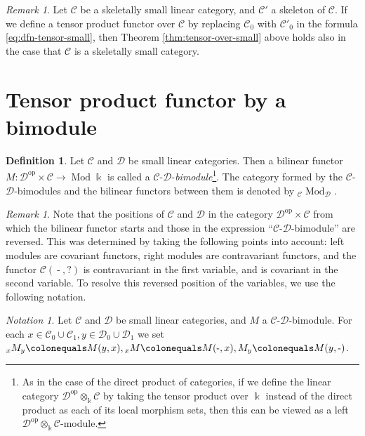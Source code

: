 \documentclass{surv-l}
\numberwithin{equation}{chapter}
\numberwithin{figure}{chapter}
\theoremstyle{plain}
\theoremstyle{definition}
\newtheorem{dfn}[thm]{Definition}
\theoremstyle{remark}
\newtheorem{rmk}[thm]{Remark}
\newtheorem{ntn}[thm]{Notation}
\newcommand{\bMod}[2]{{}_{#1}\!\Mod_{#2}}
\DeclareMathOperator{\Mod}{Mod}
\DeclareMathOperator{\blank}{-}
\begin{document}
\begin{rmk}
Let ${\mathcal{C}}$ be a skeletally small linear category, and ${\mathcal{C}}'$ a skeleton of ${\mathcal{C}}$.
If we define a tensor product functor over ${\mathcal{C}}$ by replacing ${\mathcal{C}}_0$ with ${\mathcal{C}}'_0$
in the formula \eqref{eq:dfn-tensor-small},
then Theorem \ref{thm:tensor-over-small} above holds also in the case that
${\mathcal{C}}$ is a skeletally small category.
\end{rmk}

\section{Tensor product functor by a bimodule}

\begin{dfn}\label{dfn:bimodule}
Let ${\mathcal{C}}$ and ${\mathcal{D}}$ be small linear categories.
Then a bilinear functor $M \colon {\mathcal{D}}^{\mathrm{op}} \times {\mathcal{C}} \to \Mod\Bbbk$ is called
a ${\mathcal{C}}$-${\mathcal{D}}$-\emph{bimodule}\footnote{As in the case of the direct product of categories,
if we define the linear category ${\mathcal{D}}^{\mathrm{op}} \otimes_\Bbbk {\mathcal{C}}$
by taking the tensor product over $\Bbbk$ instead of the direct product
as each of its local morphism sets,
then this can be viewed as a left ${\mathcal{D}}^{\mathrm{op}} \otimes_\Bbbk {\mathcal{C}}$-module.
}.
The category formed by the ${\mathcal{C}}$-${\mathcal{D}}$-bimodules and
the bilinear functors between them is denoted by $\bMod{\mathcal{C}}{\mathcal{D}}$.
\end{dfn}

\begin{rmk}
Note that the positions of ${\mathcal{C}}$ and ${\mathcal{D}}$ in the category ${\mathcal{D}}^{\mathrm{op}} \times {\mathcal{C}}$
from which the bilinear functor starts and those in the expression ``${\mathcal{C}}$-${\mathcal{D}}$-bimodule'' are reversed.
This was determined by taking the following points into account:
left modules are covariant functors, right modules are contravariant functors,
and the functor ${\mathcal{C}}(\blank, ?)$ is contravariant in the first variable,
and is covariant in the second variable.
To resolve this reversed position of the variables, we use the following notation.
\end{rmk}

\begin{ntn}
Let ${\mathcal{C}}$ and ${\mathcal{D}}$ be small linear categories, and $M$ a ${\mathcal{C}}$-${\mathcal{D}}$-bimodule.
For each $x \in {\mathcal{C}}_0 \cup {\mathcal{C}}_1, y \in {\mathcal{D}}_0 \cup {\mathcal{D}}_1$ we set
${}_xM_y\colonequals  M(y, x), {}_xM\colonequals  M(\text{-}, x), M_y\colonequals  M(y, \text{-})$.
\end{ntn}
\end{document}

